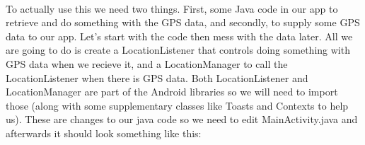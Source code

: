 \paragraph{} To actually use this we need two things. First, some Java code in our app to retrieve and do something with the GPS data, and secondly, to supply some GPS data to our app. Let's start with the code then mess with the data later. All we are going to do is create a LocationListener that controls doing something with GPS data when we recieve it, and a LocationManager to call the LocationListener when there is GPS data. Both LocationListener and LocationManager are part of the Android libraries so we will need to import those (along with some supplementary classes like Toasts and Contexts to help us). These are changes to our java code so we need to edit MainActivity.java and afterwards it should look something like this:

